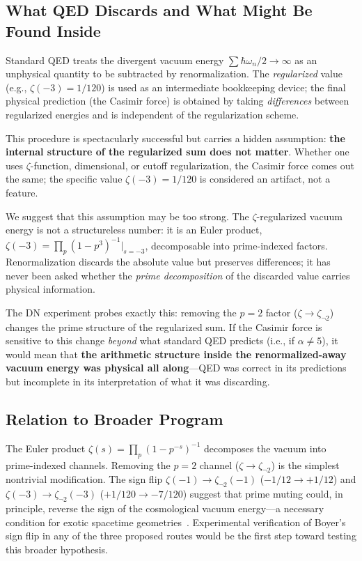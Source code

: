 \documentclass[aps,prd,twocolumn,superscriptaddress,nofootinbib]{revtex4-2}
\begin{document}
\subsection{What QED Discards and What Might Be Found Inside}

Standard QED treats the divergent vacuum energy
$\sum\hbar\omega_n/2\to\infty$ as an unphysical quantity to be
subtracted by renormalization.  The \emph{regularized} value
(e.g., $\zeta(-3)=1/120$) is used as an intermediate bookkeeping
device; the final physical prediction (the Casimir force) is
obtained by taking \emph{differences} between regularized
energies and is independent of the regularization scheme.

This procedure is spectacularly successful but carries a
hidden assumption: \textbf{the internal structure of the
regularized sum does not matter}.  Whether one uses
$\zeta$-function, dimensional, or cutoff regularization, the
Casimir force comes out the same; the specific value
$\zeta(-3)=1/120$ is considered an artifact, not a feature.

We suggest that this assumption may be too strong.  The
$\zeta$-regularized vacuum energy is not a structureless number:
it is an Euler product,
$\zeta(-3)=\prod_p(1-p^3)^{-1}|_{s=-3}$,
decomposable into prime-indexed factors.  Renormalization
discards the absolute value but preserves differences; it has
never been asked whether the \emph{prime decomposition} of the
discarded value carries physical information.

The DN experiment probes exactly this:
removing the $p{=}2$ factor ($\zeta\to\zeta_{\neg 2}$) changes
the prime structure of the regularized sum.
If the Casimir force is sensitive to this change
\emph{beyond} what standard QED predicts (i.e., if $\alpha\neq 5$),
it would mean that \textbf{the arithmetic structure inside the
renormalized-away vacuum energy was physical all along}---QED
was correct in its predictions but incomplete in its
interpretation of what it was discarding.

\subsection{Relation to Broader Program}

The Euler product $\zeta(s)=\prod_p(1{-}p^{-s})^{-1}$
decomposes the vacuum into prime-indexed channels.  Removing the
$p{=}2$ channel ($\zeta\to\zeta_{\neg 2}$) is the simplest
nontrivial modification.  The sign flip
$\zeta(-1)\to\zeta_{\neg 2}(-1)$ ($-1/12\to+1/12$) and
$\zeta(-3)\to\zeta_{\neg 2}(-3)$ ($+1/120\to-7/120$) suggest
that prime muting could, in principle, reverse the sign of
the cosmological vacuum energy---a necessary condition for
exotic spacetime geometries~\cite{Alcubierre1994,Visser1995}.
Experimental verification of Boyer's sign flip in any of the
three proposed routes would be the first step toward testing
this broader hypothesis.
\end{document}
